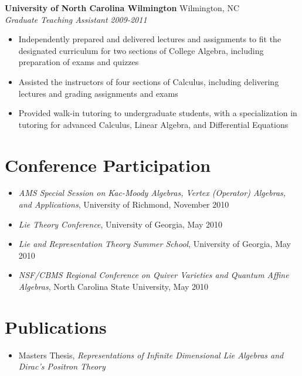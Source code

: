 \documentclass[11pt]{article}
\begin{document}
\noindent
{\bf University of North Carolina Wilmington} \hfill Wilmington, NC\\
{\it Graduate Teaching Assistant} \hfill {\it 2009-2011}

\begin{itemize}
\setlength{\itemsep}{1pt}

\item Independently prepared and delivered lectures and assignments to fit
the designated curriculum for two sections of College Algebra, including
preparation of exams and quizzes

\item Assisted the instructors of four sections of Calculus, including
delivering lectures and grading assignments and exams

\item	Provided walk-in tutoring to undergraduate students, with a
specialization in tutoring for advanced Calculus, Linear Algebra,
and Differential Equations

\end{itemize}



\section*{Conference Participation}

\begin{itemize}
\setlength{\itemsep}{1pt}
\item	{\it AMS Special Session on Kac-Moody Algebras, Vertex (Operator)
Algebras, and Applications}, University of Richmond, November 2010
\item	{\it Lie Theory Conference}, University of Georgia, May 2010
\item	{\it Lie and Representation Theory Summer School}, University of Georgia,
May 2010
\item	{\it NSF/CBMS Regional Conference on Quiver Varieties and Quantum Affine
Algebras}, North Carolina State University, May 2010
\end{itemize}


\section*{Publications}

\begin{itemize}

\item Masters Thesis, {\it Representations of Infinite Dimensional Lie Algebras
and Dirac's Positron Theory}

\end{itemize}
\end{document}
